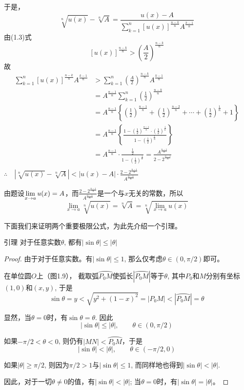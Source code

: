 于是，
\[\sqrt[n]{u(x)}-\sqrt[n]{A}=\frac{u(x)-A}{\sum^n_{k=1}[u(x)]^{\tfrac{n-k}{n}}A^{\tfrac{k-1}{n}}}\]
由(1.3)式
\[[u(x)]^{\tfrac{n-k}{n}}>\left(\frac{A}{2}\right)^{\tfrac{n-k}{n}}\]
故
\[\begin{split}
    \sum^n_{k=1}[u(x)]^{\tfrac{n-k}{n}}A^{\tfrac{k-1}{n}}&>\sum^n_{k=1}\left(\frac{A}{2}\right)^{\tfrac{n-k}{n}}A^{\tfrac{k-1}{n}}\\
    &=A^{\tfrac{n-1}{n}}\sum^n_{k=1}\left(\frac{1}{2}\right)^{\tfrac{n-k}{n}}\\
    &=A^{\tfrac{n-1}{n}}\left\{\left(\frac{1}{2}\right)^{\tfrac{n-1}{n}}+\left(\frac{1}{2}\right)^{\tfrac{n-2}{n}}+\cdots+\left(\frac{1}{2}\right)^{\tfrac{1}{n}}+1\right\}\\
    &=A^{\tfrac{n-1}{n}}\left\{\frac{1-\left(\frac{1}{2}\right)^{\tfrac{n-1}{n}}\cdot \left(\frac{1}{2}\right)^{\tfrac{1}{n}}}{1-\left(\frac{1}{2}\right)^{\tfrac{1}{n}}}\right\}\\
    &=A^{\tfrac{n-1}{n}}\cdot\frac{\frac{1}{2}}{1-\left(\frac{1}{2}\right)^{\tfrac{1}{n}}}=\frac{A^{\tfrac{n-1}{n}}}{2-2^{\tfrac{n-1}{n}}}\\
\end{split}\]
$\therefore\quad \left|\sqrt[n]{u(x)}-\sqrt[n]{A}\right|<|u(x)-A|\cdot \frac{2-2^{\tfrac{n-1}{n}}}{A^{\tfrac{n-1}{n}}}$

由题设$\displaystyle\lim_{x\to a}u(x)=A$，而$\frac{2-2^{\tfrac{n-1}{n}}}{A^{\tfrac{n-1}{n}}}$是一个与$x$无关的常数，所以
\[\lim_{x\to a} \sqrt[n]{u(x)}=\sqrt[n]{A}=\sqrt[n]{\lim_{x\to a}u(x)}\]

下面我们来证明两个重要极限公式，为此先介绍一个引理。

\begin{blk}{引理}
     对于任意实数$\theta$, 都有$|\sin\theta|\le |\theta|$
\end{blk}

\begin{proof}
  由于对于任意实数。有$|\sin\theta|\le 1$, 那么仅考虑$\theta\in (0,\pi/2)$即可。
  
  在单位圆$O$上（图1.9），
 截取弧$\wideparen{P_0M}$使弧长$|\wideparen{P_0M}|$等于$\theta$, 其中$P_0$和$M$分别有坐标$(1, 0)$和$(x,y)$, 于是
 \[\sin\theta =y<\sqrt{y^2+ (1-x)^2} =|P_0M|<|\wideparen{P_0M}|=\theta\]
 
 显然，当$\theta=0$时，有$\sin\theta=\theta$. 因此
\[  |\sin\theta | \le |\theta|,\qquad  \theta\in  (0,\pi/2)\]

  如果$-\pi/2<\theta<0$, 则仍有$|MN|<\wideparen{P_0M}$，于是
\[|\sin\theta|<|\theta|,\qquad \theta\in (-\pi/2, 0) \]

  如果$|\theta|\ge \pi/2$, 则因为$\pi/2>1$与$|\sin\theta|\le 1$, 而同样地也得到$|\sin\theta|<|\theta|$. 
  
  因此，对于一切$\theta\ne 0$的值，有$|\sin\theta|<|\theta|$; 当$\theta=0$时，有$|\sin\theta|=|\theta|$。
\end{proof}



